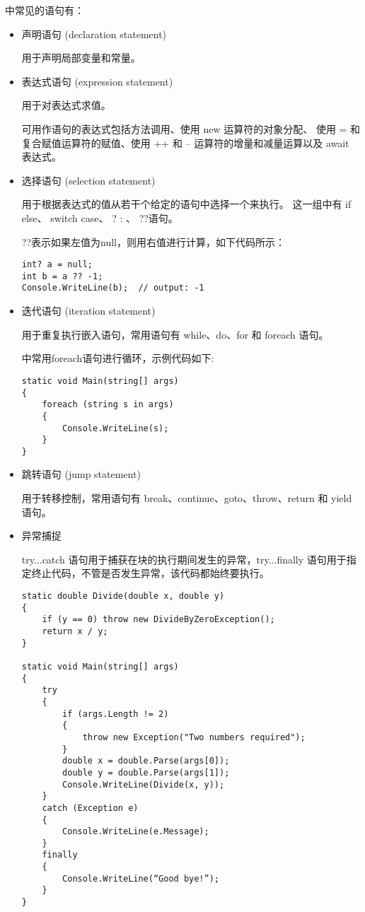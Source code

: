 \cs 中常见的语句有：
\begin{itemize}
\item 声明语句 (declaration statement) 

    用于声明局部变量和常量。

\item 表达式语句 (expression statement) 

    用于对表达式求值。

    可用作语句的表达式包括方法调用、使用 new 运算符的对象分配、
使用 = 和复合赋值运算符的赋值、使用 ++ 和 -- 运算符的增量和减量运算以及 await 表达式。

\item 选择语句 (selection statement) 

用于根据表达式的值从若干个给定的语句中选择一个来执行。
这一组中有 if else、 switch case、 ? : 、 ??语句。

??表示如果左值为null，则用右值进行计算，如下代码所示：
\begin{lstlisting}
int? a = null;
int b = a ?? -1;
Console.WriteLine(b);  // output: -1
\end{lstlisting}

\item 迭代语句 (iteration statement) 

用于重复执行嵌入语句，常用语句有 while、do、for 和 foreach 语句。

\cs 中常用foreach语句进行循环，示例代码如下:

\begin{lstlisting}
static void Main(string[] args)
{
    foreach (string s in args)
    {
        Console.WriteLine(s);
    }
}
\end{lstlisting}


\item 跳转语句 (jump statement) 

用于转移控制，常用语句有 break、continue、goto、throw、return 和 yield 语句。

\item 异常捕捉

try...catch 语句用于捕获在块的执行期间发生的异常，try...finally 语句用于指定终止代码，不管是否发生异常，该代码都始终要执行。
    
\begin{lstlisting}
static double Divide(double x, double y)
{
    if (y == 0) throw new DivideByZeroException();
    return x / y;
}

static void Main(string[] args)
{
    try
    {
        if (args.Length != 2)
        {
            throw new Exception("Two numbers required");
        }
        double x = double.Parse(args[0]);
        double y = double.Parse(args[1]);
        Console.WriteLine(Divide(x, y));
    }
    catch (Exception e)
    {
        Console.WriteLine(e.Message);
    }
    finally
    {
        Console.WriteLine(“Good bye!”);
    }
}
\end{lstlisting}


\end{itemize}
